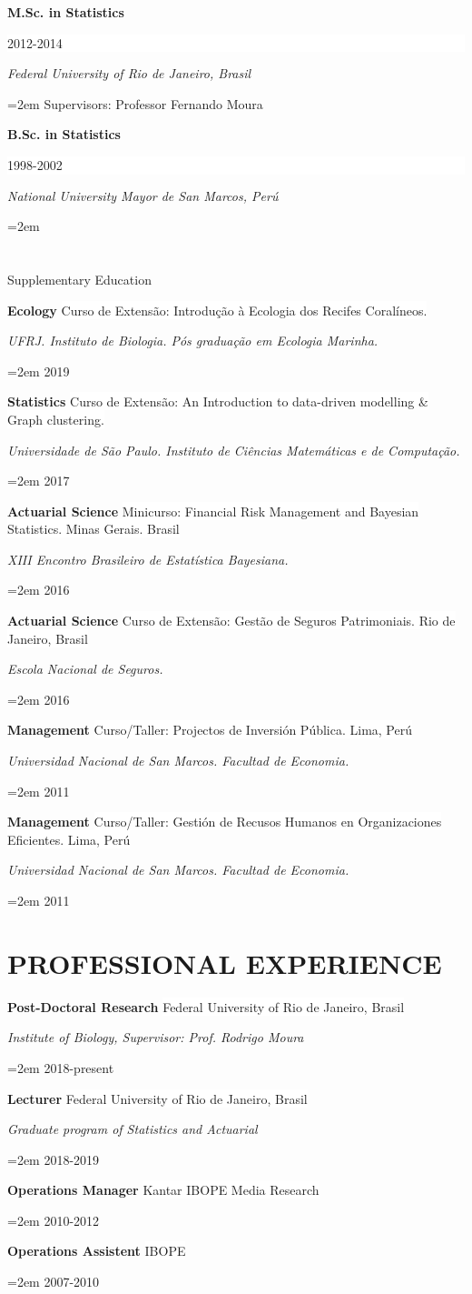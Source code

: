 \documentclass[paper=a4,fontsize=11pt]{scrartcl}	 			%
\newcommand{\sepspace}{\vspace*{1em}}			%
\newcommand{\NewPart}[1]{\section*{\uppercase{#1}}}
\newcommand{\EducationEntry}[4]{
		\noindent \textbf{#1} \hfill 					%
		\colorbox{White}{%
			\parbox{10em}{%
			\hfill\color{Black}#2}} \par				%
		\noindent \textit{#3} \par					%
		\noindent\hangindent=2em\hangafter=0 \small #4 	%
		\normalsize \par}
\newcommand{\WorkEntry}[4]{						%
		\noindent \textbf{#1} \hfill 					%
		\colorbox{White}{\color{Black}#2} \par		%
		\noindent \textit{#3} \par					%
		\noindent\hangindent=2em\hangafter=0 \small #4 	%
		\normalsize \par}
\begin{document}
\EducationEntry{M.Sc. in Statistics}{2012-2014}{Federal University of Rio de Janeiro, Brasil}{Supervisors: Professor Fernando Moura}
\sepspace

\EducationEntry{B.Sc. in Statistics}{1998-2002}{National University Mayor de San Marcos, Per\'{u}}



\NewPart{Supplementary Education}{}

\WorkEntry{Ecology}{Curso de Extensão: Introdução à Ecologia dos Recifes Coralíneos.}{UFRJ. Instituto de Biologia. Pós graduação em Ecologia Marinha.}{2019}
\sepspace


\WorkEntry{Statistics}{Curso de Extensão: An Introduction to data-driven modelling \& Graph clustering.}{Universidade de São Paulo. Instituto de Ciências Matemáticas e de Computação.}{2017}
\sepspace

\WorkEntry{Actuarial Science}{Minicurso: Financial Risk Management and Bayesian Statistics. Minas Gerais. Brasil}{XIII Encontro Brasileiro de Estatística Bayesiana.}{2016}
\sepspace

\WorkEntry{Actuarial Science}{Curso de Extensão: Gestão de Seguros Patrimoniais. Rio de Janeiro, Brasil}{Escola Nacional de Seguros.}{2016}
\sepspace

\WorkEntry{Management}{Curso/Taller: Projectos de Inversión Pública. Lima, Perú}{Universidad Nacional de San Marcos. Facultad de Economia.}{2011}
\sepspace

\WorkEntry{Management}{Curso/Taller: Gestión de Recusos Humanos en Organizaciones Eficientes. Lima, Perú}{Universidad Nacional de San Marcos. Facultad de Economia.}{2011}
\sepspace





\NewPart{Professional Experience}{}
\WorkEntry{Post-Doctoral Research}{Federal University of Rio de Janeiro, Brasil}{Institute of Biology, Supervisor: Prof. Rodrigo Moura}{2018-present}
\sepspace

\WorkEntry{Lecturer}{Federal University of Rio de Janeiro, Brasil}{Graduate program of Statistics and Actuarial}{2018-2019}
\sepspace

\WorkEntry{Operations Manager}{Kantar IBOPE Media Research}{}{2010-2012}
\sepspace

\WorkEntry{Operations Assistent}{IBOPE}{}{2007-2010}
\sepspace


\end{document}

